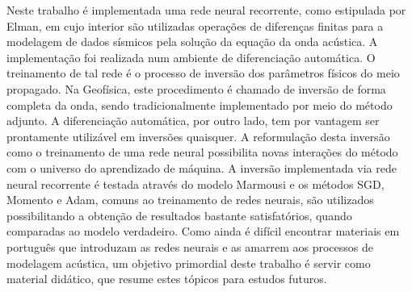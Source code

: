  

Neste trabalho é implementada uma rede neural recorrente, como estipulada por Elman, em cujo interior são utilizadas operações de diferenças finitas para a modelagem de dados sísmicos pela solução da equação da onda acústica. A implementação foi realizada num ambiente de diferenciação automática. O treinamento de tal rede é o processo de inversão dos parâmetros físicos do meio propagado. Na Geofísica, este procedimento é chamado de inversão de forma completa da onda, sendo tradicionalmente implementado por meio do método adjunto. A diferenciação automática, por outro lado, tem por vantagem ser prontamente utilizável em inversões quaisquer. A reformulação desta inversão como o treinamento de uma rede neural possibilita novas interações do método com o universo do aprendizado de máquina. A inversão implementada via rede neural recorrente é testada através do modelo Marmousi e os métodos SGD, Momento e Adam, comuns ao treinamento de redes neurais, são utilizados possibilitando a obtenção de resultados bastante satisfatórios, quando comparadas ao modelo verdadeiro. Como ainda é difícil encontrar materiais em português que introduzam as redes neurais e as amarrem aos processos de modelagem acústica, um objetivo primordial deste trabalho é servir como material didático, que resume estes tópicos para estudos futuros.
